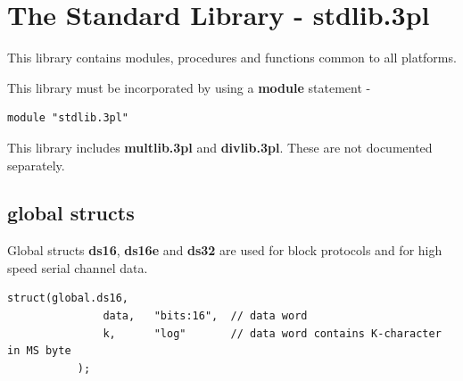 \pagebreak

\section{The Standard Library - stdlib.3pl}

    This library contains modules, procedures and functions common
    to all platforms.
    
    This library must be incorporated by using a {\bf module} statement -
    \begin{lstlisting}[gobble=4, language=threepl]
       module "stdlib.3pl"
    \end{lstlisting}
    
    This library includes {\bf multlib.3pl} and {\bf divlib.3pl}. These are
    not documented separately.

    \subsection{global structs}
        
%
%        
%
%        
        
        Global structs {\bf ds16}, {\bf ds16e} and {\bf ds32} are
        used for block protocols and for high speed serial channel data.

        \begin{lstlisting}[gobble=8, language=threepl]
           struct(global.ds16,
               data,   "bits:16",  // data word
               k,      "log"       // data word contains K-character in MS byte
           );
        \end{lstlisting}

